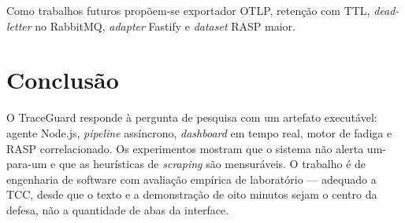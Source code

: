 \documentclass[
  12pt,
  oneside,
  a4paper,
  english,
  brazil,
  sumario=tradicional
]{abntex2}
\begin{document}
Como trabalhos futuros propõem-se exportador OTLP, retenção com TTL, \textit{dead-letter} no RabbitMQ, \textit{adapter} Fastify e \textit{dataset} RASP maior.

\chapter{Conclusão}

O TraceGuard responde à pergunta de pesquisa com um artefato executável: agente Node.js, \textit{pipeline} assíncrono, \textit{dashboard} em tempo real, motor de fadiga e RASP correlacionado. Os experimentos mostram que o sistema não alerta um-para-um e que as heurísticas de \textit{scraping} são mensuráveis. O trabalho é de engenharia de software com avaliação empírica de laboratório --- adequado a TCC, desde que o texto e a demonstração de oito minutos sejam o centro da defesa, não a quantidade de abas da interface.


\end{document}
